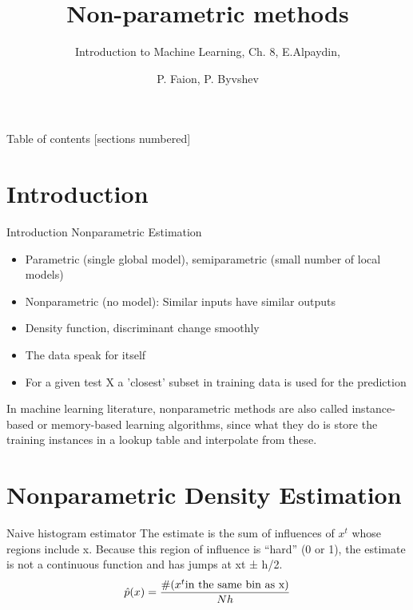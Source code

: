 \documentclass{beamer}
\title{Non-parametric methods}
\subtitle{Introduction to 
Machine Learning, Ch. 8, E.Alpaydin, }
\date{}
\author{P. Faion, P. Byvshev}
\institute{UOs}
\begin{document}
\maketitle

\begin{frame}{Table of contents}
  [sections numbered]
  \tableofcontents[hideallsubsections]
\end{frame}

\section{Introduction}

\begin{frame}[fragile]{Introduction}
Nonparametric Estimation
	\begin{itemize}
		\item Parametric (single global model), semiparametric (small number of local models)
		\item Nonparametric (no model): Similar inputs have similar outputs
		\item Density function, discriminant change smoothly
		\item The data speak for itself
        \item For a given test X a 'closest' subset in training data is used for the prediction 
	\end{itemize}
In machine learning literature, nonparametric methods are also called
instance-based or memory-based learning algorithms, since what they do
is store the training instances in a lookup table and interpolate from
these.
    



\end{frame}


\section{Nonparametric Density Estimation}

\begin{frame}[fragile]{Naive histogram estimator}
The estimate is the sum of influences of $x^t$ whose regions include x.
Because this region of influence is “hard” (0 or 1), the estimate is not a
continuous function and has jumps at xt ± h/2.
	\begin{equation}
		\hat p(x)=\frac{\#(x^t \textnormal{in the same bin as x})}{Nh}
	\end{equation}

    



\end{frame}
\end{document}
